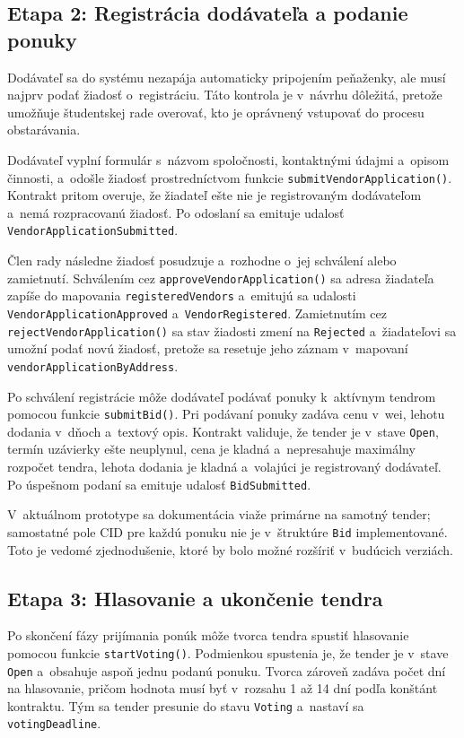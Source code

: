\subsection{Etapa 2: Registrácia dodávateľa a podanie ponuky}
\label{subsec:lifecycle_bidding}

Dodávateľ sa do systému nezapája automaticky pripojením peňaženky, ale musí
najprv podať žiadosť o~registráciu. Táto kontrola je v~návrhu dôležitá,
pretože umožňuje študentskej rade overovať, kto je oprávnený vstupovať
do procesu obstarávania.

Dodávateľ vyplní formulár s~názvom spoločnosti, kontaktnými údajmi
a~opisom činnosti, a~odošle žiadosť prostredníctvom funkcie
\texttt{submitVendorApplication()}. Kontrakt pritom overuje, že žiadateľ
ešte nie je registrovaným dodávateľom a~nemá rozpracovanú žiadosť.
Po odoslaní sa emituje udalosť \texttt{VendorApplicationSubmitted}.

Člen rady následne žiadosť posudzuje a~rozhodne o~jej schválení alebo
zamietnutí. Schválením cez \texttt{approveVendorApplication()} sa adresa
žiadateľa zapíše do mapovania \texttt{registeredVendors} a~emitujú sa
udalosti \texttt{VendorApplicationApproved} a~\texttt{VendorRegistered}.
Zamietnutím cez \texttt{rejectVendorApplication()} sa stav žiadosti zmení
na \texttt{Rejected} a~žiadateľovi sa umožní podať novú žiadosť, pretože
sa resetuje jeho záznam v~mapovaní \texttt{vendorApplicationByAddress}.

Po schválení registrácie môže dodávateľ podávať ponuky k~aktívnym tendrom
pomocou funkcie \texttt{submitBid()}. Pri podávaní ponuky zadáva cenu v~wei,
lehotu dodania v~dňoch a~textový opis. Kontrakt validuje, že tender je
v~stave \texttt{Open}, termín uzávierky ešte neuplynul, cena je kladná
a~nepresahuje maximálny rozpočet tendra, lehota dodania je kladná
a~volajúci je registrovaný dodávateľ. Po úspešnom podaní sa emituje
udalosť \texttt{BidSubmitted}.

V~aktuálnom prototype sa dokumentácia viaže primárne na samotný tender;
samostatné pole CID pre každú ponuku nie je v~štruktúre \texttt{Bid}
implementované. Toto je vedomé zjednodušenie, ktoré by bolo možné rozšíriť
v~budúcich verziách.

\subsection{Etapa 3: Hlasovanie a ukončenie tendra}
\label{subsec:lifecycle_voting}

Po skončení fázy prijímania ponúk môže tvorca tendra spustiť hlasovanie
pomocou funkcie \texttt{startVoting()}. Podmienkou spustenia je, že tender
je v~stave \texttt{Open} a~obsahuje aspoň jednu podanú ponuku. Tvorca
zároveň zadáva počet dní na hlasovanie, pričom hodnota musí byť v~rozsahu
1 až 14 dní podľa konštánt kontraktu. Tým sa tender presunie do stavu
\texttt{Voting} a~nastaví sa \texttt{votingDeadline}.

